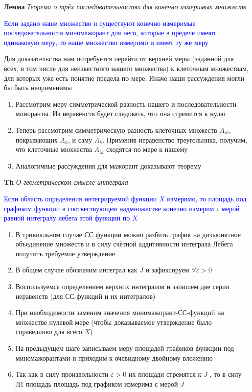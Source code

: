 \textbf{Лемма} \textit{Теорема о трёх последовательностях для конечно измеримых множеств}

\textcolor{blue}{Если задано наше множество и существуют конечно измеримые последовательности
миномажорант для него, которые в пределе имеют одинаковую меру, то наше множество измеримо и имеет ту же меру}

Для доказательства нам потребуется перейти от верхней меры (заданной для всех, в том числе для неизвестного нашего
множества) к клеточным множествам, для которых уже есть понятие предела по мере.
Иначе наши рассуждения могли бы быть неприменимы

\begin{enumerate}
    \item Рассмотрим  меру симметрической разность нашего и последовательности миноранты.
    Из неравенств будет следовать, что она стремится к нулю
    \item Теперь рассмотрим симметрическую разность клеточных множеств $A_{ik}$, покрывающих $A_k$, и саму $A_k$.
    Применив неравенство треугольника, получим, что клеточные множества $A_{ik}$ сходятся по мере к нашему
    \item Аналогичные рассуждения для мажорант доказывают теорему
\end{enumerate}

\textbf{Th} \textit{О геометрическом смысле интеграла}

\textcolor{blue}{Если область определения интегрируемой функции $X$ измеримо, то площадь под графиком функции в
соотвествующем надмножестве конечно измерим с мерой равной интегралу лебега этой функции по $X$}

\begin{enumerate}
    \item В тривиальном случае СС функции можно разбить график на дизъюнктное объединение множеств и в силу
    счётной аддитивности интеграла Лебега получить требуемое утверждение
    \item В общем случае обозначим интеграл как $J$ и зафиксируем $\forall \varepsilon > 0$
    \item Воспользуемся определением верхних интегралов и запишем две серии неравенств (для СС-функций и их
    интегралов)
    \item При необходимости заменим значения миномажорант-СС-функций на множестве нулевой мере (чтобы
    доказываемое утверждение было справедливо для всего $X$)
    \item На предыдущем шаге записываем меру площадей графиков функции под миномажорантами и приходим к
    очевидному двойному вложению
    \item Так как в силу произвольности $\varepsilon > 0$ их площади стремятся к $J$ , то в силу Л1 площадь
    площадь под графиком измерима с мерой $J$
\end{enumerate}

